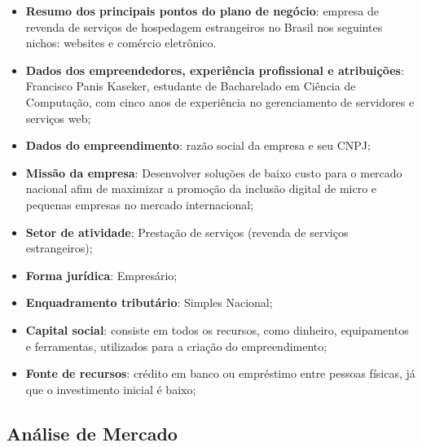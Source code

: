 \documentclass[12pt]{article}
\begin{document}
\begin{itemize}

	\item \textbf{Resumo dos principais pontos do plano de negócio}: empresa de revenda de serviços de hospedagem estrangeiros no Brasil nos seguintes nichos: websites e comércio eletrônico.
	
	\item \textbf{Dados dos empreendedores, experiência profissional e atribuições}: Francisco Panis Kaseker,
	estudante de Bacharelado em Ciência de Computação, com cinco anos de experiência no gerenciamento de servidores e serviços web;
	
	\item \textbf{Dados do empreendimento}: razão social da empresa e seu CNPJ;
	
	\item \textbf{Missão da empresa}: Desenvolver soluções de baixo custo para o mercado nacional afim de maximizar a promoção da inclusão digital de
	micro e pequenas empresas no mercado internacional;
	
	\item \textbf{Setor de atividade}: Prestação de serviços (revenda de serviços estrangeiros);
	
	\item \textbf{Forma jurídica}: Empresário;

	\item \textbf{Enquadramento tributário}: Simples Nacional;

	\item \textbf{Capital social}: consiste em todos os recursos, como dinheiro, equipamentos e ferramentas, utilizados para a
	criação do empreendimento;
	
	\item \textbf{Fonte de recursos}: crédito em banco ou empréstimo entre pessoas físicas, já que o investimento inicial é baixo;

\end{itemize}


\subsection{Análise de Mercado}
\end{document}
